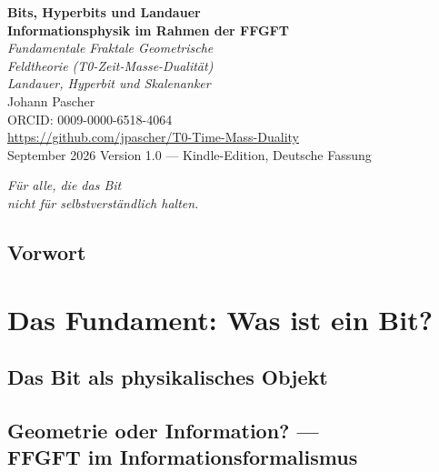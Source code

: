 \documentclass[11pt,oneside]{book}
\theoremstyle{plain}
\begin{document}
\begin{titlepage}
\centering\vspace*{1.5cm}
{\Huge\bfseries\color{blue!70!black} Bits, Hyperbits und Landauer}\\[0.6cm]
{\Large\bfseries\color{blue!40!black} Informationsphysik im Rahmen der FFGFT}\\[1cm]
{\LARGE\itshape Fundamentale Fraktale Geometrische\\[0.2cm]
Feldtheorie (T0-Zeit-Masse-Dualität)}\\[0.5cm]
{\large\itshape Landauer, Hyperbit und Skalenanker}\\[2cm]
{\large Johann Pascher}\\[0.3cm]
{\normalsize ORCID: 0009-0000-6518-4064}\\[0.3cm]
{\normalsize\url{https://github.com/jpascher/T0-Time-Mass-Duality}}\\[1.5cm]
{\normalsize September 2026}
\vfill{\small Version 1.0 --- Kindle-Edition, Deutsche Fassung}
\end{titlepage}

\thispagestyle{empty}
\vspace*{0.3\textheight}
\begin{center}\itshape\large
Für alle, die das Bit\\nicht für selbstverständlich halten.
\end{center}\vfill

\tableofcontents

\chapter*{Vorwort}


\mainmatter

\part{Das Fundament: Was ist ein Bit?}
\chapter{Das Bit als physikalisches Objekt}

\chapter[Geometrie oder Information?]{Geometrie oder Information? ---\\ FFGFT im Informationsformalismus}

\end{document}
